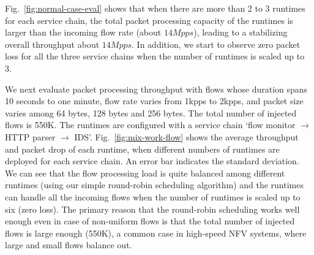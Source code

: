 

Fig.~\ref{fig:normal-case-eval} shows that %
 when there are more than 2 to 3 runtimes for each service chain, the total packet processing capacity of the runtimes is larger than the incoming flow rate (about $14Mpps$), leading to a stabilizing overall throughput about $14Mpps$.  %
 In addition, we start to observe zero packet loss for all the three service chains when the number of runtimes is scaled up to 3.



 We next evaluate packet processing throughput with flows whose duration spans 10 seconds to one minute, %
flow rate varies from 1kpps to 2kpps, %
 and packet size varies among 64 bytes, 128 bytes and 256 bytes. The total number of injected flows is 550K.
 The runtimes are configured with a service chain `flow monitor $\rightarrow$ HTTP parser $\rightarrow$ IDS'. Fig.~\ref{fig:mix-work-flow} shows the average throughput and packet drop of each runtime, when different numbers of runtimes are deployed for each service chain. An error bar indicates the standard deviation. We can see that the flow processing load is quite balanced among different runtimes (using our simple round-robin scheduling algorithm) and the runtimes can handle all the incoming flows when the number of runtimes is scaled up to six (zero loss). The primary reason that the round-robin scheduling works well enough even in case of non-uniform flows is that the total number of injected flows is large enough (550K), a common case in high-speed NFV systems, where large and small flows balance out.

